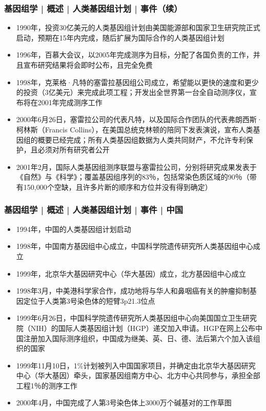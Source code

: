\begin{frame}
  \frametitle{基因组学 | 概述 | 人类基因组计划 | 事件（续）}
  \begin{itemize}[<+->]
    \item 1990年，投资30亿美元的人类基因组计划由美国能源部和国家卫生研究院正式启动，预期在15年内完成，随后扩展为国际合作的人类基因组计划
    \item 1996年，百慕大会议，以2005年完成测序为目标，分配了各国负责的工作，并且宣布研究结果将会即时公布，且完全免费
    \item 1998年，克莱格·凡特的塞雷拉基因组公司成立，希望能以更快的速度和更少的投资（3亿美元）来完成此项工程；开发出全世界第一台全自动测序仪，宣布将在2001年完成测序工作
    \item 2000年6月26日，塞雷拉公司的代表凡特，以及国际合作团队的代表弗朗西斯·柯林斯（Francis Collins），在美国总统克林顿的陪同下发表演说，宣布人类基因组的概要已经完成；所有人类基因组数据为人类共同财产，不允许专利保护，且必须对所有研究者公开
    \item 2001年2月，国际人类基因组测序联盟与塞雷拉公司，分别将研究成果发表于《自然》与《科学》；覆盖基因组序列的83％，包括常染色质区域的90％（带有150,000个空缺，且许多片断的顺序和方位并没有得到确定）
  \end{itemize}
\end{frame}

\begin{frame}
  \frametitle{基因组学 | 概述 | 人类基因组计划 | 事件 | 中国}
  \begin{itemize}[<+->]
    \item 1994年，中国的人类基因组计划启动
    \item 1998年，中国南方基因组中心成立，中国科学院遗传研究所人类基因组中心成立
    \item 1999年，北京华大基因研究中心（华大基因）成立，北方基因组中心成立
    \item 1998年3月，中美港科学家合作，成功地将与华人和鼻咽癌有关的肿瘤抑制基因定位于人类第3号染色体的短臂3p21.3位点
    \item 1999年6月26日，中国科学院遗传研究所人类基因组中心向美国国立卫生研究院（NIH）的国际人类基因组计划（HGP）递交加入申请。HGP在网上公布中国注册加入国际测序组织，中国成为继美、英、日、德、法后第六个加入该组织的国家
    \item 1999年11月10日，1\%计划被列入中国国家项目，并确定由北京华大基因研究中心（华大基因）牵头，国家基因组南方中心、北方中心共同参与，承担全部工程1％的测序工作
    \item 2000年4月，中国完成了人第3号染色体上3000万个碱基对的工作草图
  \end{itemize}
\end{frame}

